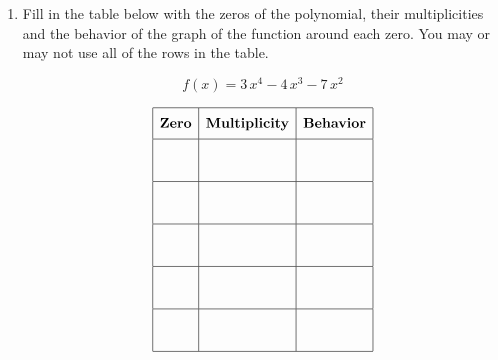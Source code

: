 \documentclass[11pt]{article}
\begin{document}
\begin{enumerate}
{{}
}

\newpage

% 

\item %
\providecommand{\stxKnowl}{}\renewcommand{\stxKnowl}[1]{#1}
\providecommand{\stxOuttro}{}\renewcommand{\stxOuttro}[1]{#1}
\providecommand{\stxTitle}{}\renewcommand{\stxTitle}[1]{#1}
\renewcommand{\stxOuttro}[1]{}
\stxKnowl{
Fill in the table below with the zeros of the polynomial, their multiplicities and the behavior of the graph of the function around each zero. You may or may not use all of the rows in the table.

\[f(x) = 3 \, x^{4} - 4 \, x^{3} - 7 \, x^{2}\]

 \[\begin{array}{|c|c|c|} \hline \rule[-0.8em]{0pt}{2.2em} \textbf{Zero} & \textbf{Multiplicity} & \textbf{Behavior} \\ \hline \rule[-1.2em]{0pt}{3em} & & \\ \hline \rule[-1.2em]{0pt}{3em} & & \\ \hline \rule[-1.2em]{0pt}{3em} & & \\ \hline \rule[-1.2em]{0pt}{3em} & & \\ \hline \rule[-1.2em]{0pt}{3em} & & \\ \hline \end{array}\] 

\stxOuttro{
Solution

\[\begin{aligned} f(x) &= 3 \, x^{4} - 4 \, x^{3} - 7 \, x^{2} \\ &= x^2(3 \, x^{2} - 4 \, x - 7) \\ &= x^2(3x - 7)(x + 1) \end{aligned}\]

 \[\begin{array}{|c|c|c|} \hline \rule[-0.8em]{0pt}{2.2em} \textbf{Zero} & \textbf{Multiplicity} & \textbf{Behavior} \\ \hline \rule[-1.2em]{0pt}{3em} -1 & 1 & \text{cross} \\ \hline \rule[-1.2em]{0pt}{3em} 0 & 2 & \text{bounce} \\ \hline \rule[-1.2em]{0pt}{3em} \frac{7}{3} & 1 & \text{cross} \\ \hline \rule[-1.2em]{0pt}{3em} & & \\ \hline \rule[-1.2em]{0pt}{3em} & & \\ \hline \end{array}\] 

}}
\end{enumerate}
\end{document}
